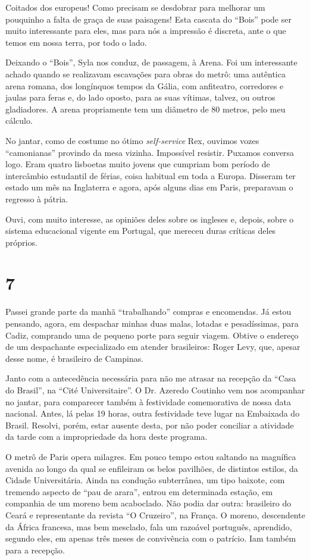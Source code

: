 Coitados dos europeus! Como precisam se desdobrar para melhorar um pouquinho a falta de graça de suas paisagens! Esta cascata do ``Bois'' pode ser muito interessante para eles, mas para nós a impressão é discreta, ante o que temos em nossa terra, por todo o lado.

Deixando o ``Bois'', Syla nos conduz, de passagem, à Arena. Foi um interessante achado quando se realizavam escavações para obras do metrô: uma autêntica arena romana, dos longínquos tempos da Gália, com anfiteatro, corredores e jaulas para feras e, do lado oposto, para as suas vítimas, talvez, ou outros gladiadores. A arena propriamente tem um diâmetro de 80 metros, pelo meu cálculo.

No jantar, como de costume no ótimo \textit{self-service} Rex, ouvimos vozes ``camonianas'' provindo da mesa vizinha. Impossível resistir. Puxamos conversa logo. Eram quatro lisboetas muito jovens que cumpriam bom período de intercâmbio estudantil de férias, coisa habitual em toda a Europa. Disseram ter estado um mês na Inglaterra e agora, após alguns dias em Paris, preparavam o regresso à pátria.

Ouvi, com muito interesse, as opiniões deles sobre os ingleses e, depois, sobre o sistema educacional vigente em Portugal, que mereceu duras críticas deles próprios.

\section*{7 \adfflatleafright {}}
Passei grande parte da manhã ``trabalhando'' compras e encomendas. Já estou pensando, agora, em despachar minhas duas malas, lotadas e pesadíssimas, para Cadiz, comprando uma de pequeno porte para seguir viagem. Obtive o endereço de um despachante especializado em atender brasileiros: Roger Levy, que, apesar desse nome, é brasileiro de Campinas.

Janto com a antecedência necessária para não me atrasar na recepção da ``Casa do Brasil'', na ``Cité Universitaire''. O Dr. Azeredo Coutinho vem nos acompanhar no jantar, para comparecer também à festividade comemorativa de nossa data nacional. Antes, lá pelas 19 horas, outra festividade teve lugar na Embaixada do Brasil. Resolvi, porém, estar ausente desta, por não poder conciliar a atividade da tarde com a impropriedade da hora deste programa.

O metrô de Paris opera milagres. Em pouco tempo estou saltando na magnífica avenida ao longo da qual se enfileiram os belos pavilhões, de distintos estilos, da Cidade Universitária. Ainda na condução subterrânea, um tipo baixote, com tremendo aspecto de ``pau de arara'', entrou em determinada estação, em companhia de um moreno bem acaboclado. Não podia dar outra: brasileiro do Ceará e representante da revista ``O Cruzeiro'', na França. O moreno, descendente da África francesa, mas bem mesclado, fala um razoável português, aprendido, segundo eles, em apenas três meses de convivência com o patrício. Iam também para a recepção.

